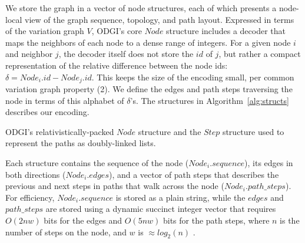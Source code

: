 \documentclass{bioinfo}
\begin{document}
We store the graph in a vector of node structures, each of which presents a node-local view of the graph sequence, topology, and path layout.
Expressed in terms of the variation graph $V$, ODGI's core $Node$ structure includes a decoder that maps the neighbors of each node to a dense range of integers.
For a given node $i$ and neighbor $j$, the decoder itself does not store the $id$ of $j$, but rather a compact representation of the relative difference between the node ids: $\delta = Node_i.id - Node_j.id$.
This keeps the size of the encoding small, per common variation graph property (2).
We define the edges and path steps traversing the node in terms of this alphabet of $\delta$'s.
The structures in Algorithm~\ref{alg:structs} describes our encoding.

\begin{algorithm}
\caption{ODGI's relativistically-packed $Node$ structure and the $Step$ structure used to represent the paths as doubly-linked lists.}
\label{alg:structs}
\end{algorithm}

Each structure contains the sequence of the node ($Node_i.sequence$), its edges in both directions ($Node_i.edges$), and a vector of path steps that describes the previous and next steps in paths that walk across the node ($Node_i.path\_steps$).
For efficiency, $Node_i.sequence$ is stored as a plain string, while the $edges$ and $path\_steps$ are stored using a dynamic succinct integer vector that requires $O(2nw)$ bits for the edges and $O(5nw)$ bits for the path steps, where $n$ is the number of steps on the node, and $w$ is $\approx log_2(n)$ \citep{prezza2017framework}.
\end{document}
